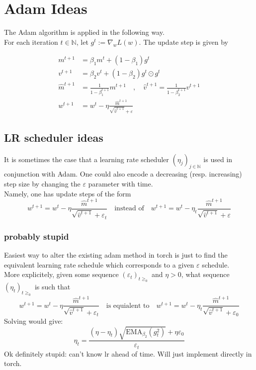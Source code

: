 \documentclass[12pt]{article}
\newcommand{\N}{\mathbb{N}}
\begin{document}
\begin{center}
\Huge{}
\end{center}
\section{Adam Ideas}
The Adam algorithm is applied in the following way. \\
For each iteration $t\in\N$, let $g^{t} := \nabla_{w}L(w)$. The update step is given by 

\begin{align*}
	m^{t+1} &= \beta_1 m^{t} + (1-\beta_1)g^{t} \\
	v^{t+1} &= \beta_2 v^{t} + (1-\beta_2) g^{t} \odot g^{t}\\
	\hat{m}^{t+1} &= \frac{1}{1-\beta_1^{t+1}} m^{t+1} \quad , \quad \hat{v}^{t+1} = \frac{1}{1-\beta_2^{t+1}} v^{t+1}\\
	w^{t+1} &= w^{t} - \eta \frac{\hat{m}^{t+1}}{\sqrt{\hat{v}^{t+1}} +\varepsilon }
\end{align*}

\subsection*{LR scheduler ideas}
It is sometimes the case that a learning rate scheduler $(\eta_{j})_{j\in\N} $ is used in conjunction with Adam. One could also encode a decreasing (resp. increasing) step size by changing the $\varepsilon $ parameter with time. 
\\
Namely, one has update steps of the form 
\[
w^{t+1} = w^{t} - \eta \frac{\hat{m}^{t+1}}{\sqrt{\hat{v}^{t+1}} + \varepsilon_t} \quad \text{instead of} \quad w^{t+1} = w^{t} - \eta_t \frac{\hat{m}^{t+1}}{\sqrt{\hat{v}^{t+1}} +\varepsilon }
\] 
\subsubsection*{probably stupid}
Easiest way to alter the existing adam method in torch is just to find the equivalent learning rate schedule which corresponds to a given  $\varepsilon $ schedule. \\ 	
More explicitely, given some sequence $(\varepsilon _{t})_{t\ge_0} $ and $\eta >0$, what sequence $(\eta_{t})_{t\ge_0 } $ is such that 
\[
w^{t+1} = w^{t} - \eta \frac{\hat{m}^{t+1}}{\sqrt{\hat{v}^{t+1}} + \varepsilon_t} \quad \text{is equialent to} \quad w^{t+1} = w^{t} - \eta_t \frac{\hat{m}^{t+1}}{\sqrt{\hat{v}^{t+1}} +\varepsilon_0 }
\] 
Solving would give:
\[
\eta_t = \frac{(\eta - \eta_t)\sqrt{\text{EMA}_{\beta_2}(g_t^2)} + \eta \varepsilon_0   }{\varepsilon _t}
\]
Ok definitely stupid: can't know lr ahead of time. 
Will just implement directly in torch.
\end{document}
